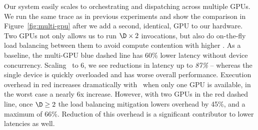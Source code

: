 Our system easily scales to orchestrating and dispatching across multiple GPUs.
We run the same trace as in previous experiments and show the comparison in Figure~\ref{fig:multi-gpu} after we add a second, identical, GPU to our hardware.
Two GPUs not only allows us to run $\D\times2$ invocations, but also do on-the-fly load balancing between them to avoid compute contention with higher \D.
As a baseline, the multi-GPU blue dashed line has 60\% lower latency without device concurrency.
Scaling \D~to 6, we see reductions in latency up to \emph{87\%} -- whereas the single device is quickly overloaded and has worse overall performance.
Execution overhead in red increases dramatically with \D~when only one GPU is available, in the worst case a nearly 6x increase.
However, with two GPUs in the red dashed line, once $\D \ge 2$ the load balancing mitigation lowers overhead by 45\%, and a maximum of 66\%.
Reduction of this overhead is a significant contributor to lower latencies as well.



